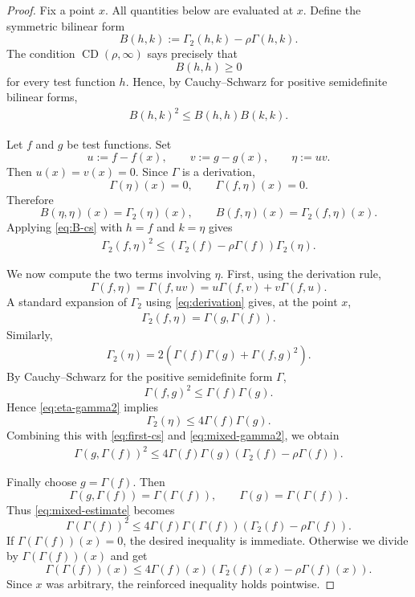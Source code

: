 \documentclass[11pt]{article}
\theoremstyle{plain}
\theoremstyle{definition}
\theoremstyle{remark}
\begin{document}
\begin{proof}
Fix a point $x$. All quantities below are evaluated at $x$. Define the
symmetric bilinear form
\[
    B(h,k):=\Gamma_2(h,k)-\rho\Gamma(h,k).
\]
The condition $\operatorname{CD}(\rho,\infty)$ says precisely that
\[
    B(h,h)\ge 0
\]
for every test function $h$. Hence, by Cauchy--Schwarz for positive
semidefinite bilinear forms,
\begin{align}\label{eq:B-cs}
    B(h,k)^2\le B(h,h)B(k,k).
\end{align}

Let $f$ and $g$ be test functions. Set
\[
    u:=f-f(x),\qquad v:=g-g(x),\qquad \eta:=uv.
\]
Then $u(x)=v(x)=0$. Since $\Gamma$ is a derivation,
\[
    \Gamma(\eta)(x)=0,
    \qquad
    \Gamma(f,\eta)(x)=0.
\]
Therefore
\[
    B(\eta,\eta)(x)=\Gamma_2(\eta)(x),
    \qquad
    B(f,\eta)(x)=\Gamma_2(f,\eta)(x).
\]
Applying \eqref{eq:B-cs} with $h=f$ and $k=\eta$ gives
\begin{align}\label{eq:first-cs}
    \Gamma_2(f,\eta)^2
    \le
    \left(\Gamma_2(f)-\rho\Gamma(f)\right)\Gamma_2(\eta).
\end{align}

We now compute the two terms involving $\eta$. First, using the derivation rule,
\[
    \Gamma(f,\eta)
    =
    \Gamma(f,uv)
    =
    u\Gamma(f,v)+v\Gamma(f,u).
\]
A standard expansion of $\Gamma_2$ using \eqref{eq:derivation} gives, at the
point $x$,
\begin{align}\label{eq:mixed-gamma2}
    \Gamma_2(f,\eta)
    =
    \Gamma(g,\Gamma(f)).
\end{align}
Similarly,
\begin{align}\label{eq:eta-gamma2}
    \Gamma_2(\eta)
    =
    2\left(\Gamma(f)\Gamma(g)+\Gamma(f,g)^2\right).
\end{align}
By Cauchy--Schwarz for the positive semidefinite form $\Gamma$,
\[
    \Gamma(f,g)^2\le \Gamma(f)\Gamma(g).
\]
Hence \eqref{eq:eta-gamma2} implies
\[
    \Gamma_2(\eta)
    \le
    4\Gamma(f)\Gamma(g).
\]
Combining this with \eqref{eq:first-cs} and \eqref{eq:mixed-gamma2}, we obtain
\begin{align}\label{eq:mixed-estimate}
    \Gamma(g,\Gamma(f))^2
    \le
    4\Gamma(f)\Gamma(g)
    \left(\Gamma_2(f)-\rho\Gamma(f)\right).
\end{align}

Finally choose $g=\Gamma(f)$. Then
\[
    \Gamma(g,\Gamma(f))=\Gamma(\Gamma(f)),
    \qquad
    \Gamma(g)=\Gamma(\Gamma(f)).
\]
Thus \eqref{eq:mixed-estimate} becomes
\[
    \Gamma(\Gamma(f))^2
    \le
    4\Gamma(f)\Gamma(\Gamma(f))
    \left(\Gamma_2(f)-\rho\Gamma(f)\right).
\]
If $\Gamma(\Gamma(f))(x)=0$, the desired inequality is immediate. Otherwise
we divide by $\Gamma(\Gamma(f))(x)$ and get
\[
    \Gamma(\Gamma(f))(x)
    \le
    4\Gamma(f)(x)
    \left(\Gamma_2(f)(x)-\rho\Gamma(f)(x)\right).
\]
Since $x$ was arbitrary, the reinforced inequality holds pointwise.
\end{proof}
\end{document}

